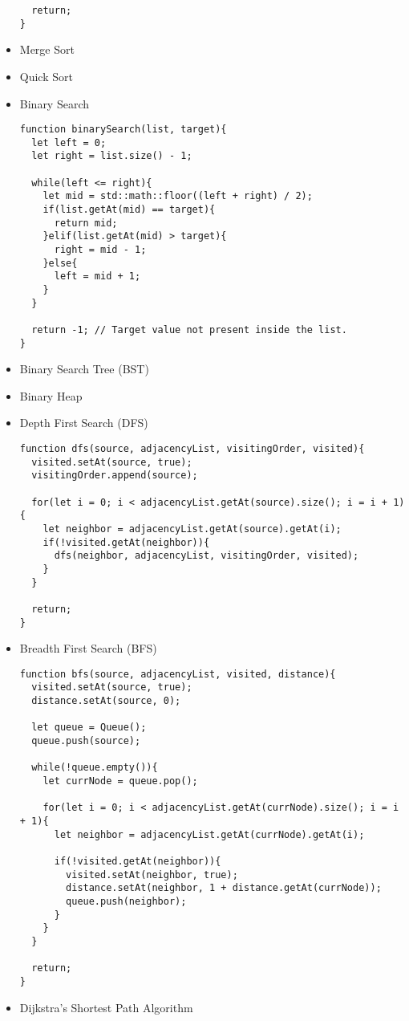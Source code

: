 \begin{itemize}
\begin{lstlisting}
  return;
}
        \end{lstlisting}
    \item Merge Sort
    \item Quick Sort
    \item Binary Search
        \begin{lstlisting}
function binarySearch(list, target){
  let left = 0;
  let right = list.size() - 1;

  while(left <= right){
    let mid = std::math::floor((left + right) / 2);
    if(list.getAt(mid) == target){
      return mid;
    }elif(list.getAt(mid) > target){
      right = mid - 1;
    }else{
      left = mid + 1;
    }
  }

  return -1; // Target value not present inside the list.
}
        \end{lstlisting}
    \item Binary Search Tree (BST)
    \item Binary Heap
    \item Depth First Search (DFS)
        \begin{lstlisting}
function dfs(source, adjacencyList, visitingOrder, visited){
  visited.setAt(source, true);
  visitingOrder.append(source);

  for(let i = 0; i < adjacencyList.getAt(source).size(); i = i + 1){
    let neighbor = adjacencyList.getAt(source).getAt(i);
    if(!visited.getAt(neighbor)){
      dfs(neighbor, adjacencyList, visitingOrder, visited);
    }
  }

  return;
}
        \end{lstlisting}
    \item Breadth First Search (BFS)
        \begin{lstlisting}
function bfs(source, adjacencyList, visited, distance){
  visited.setAt(source, true);
  distance.setAt(source, 0);

  let queue = Queue();
  queue.push(source);

  while(!queue.empty()){
    let currNode = queue.pop();

    for(let i = 0; i < adjacencyList.getAt(currNode).size(); i = i + 1){
      let neighbor = adjacencyList.getAt(currNode).getAt(i);

      if(!visited.getAt(neighbor)){
        visited.setAt(neighbor, true);
        distance.setAt(neighbor, 1 + distance.getAt(currNode));
        queue.push(neighbor);
      }
    }
  }

  return;
}
        \end{lstlisting}
    \item Dijkstra's Shortest Path Algorithm
\end{itemize}

